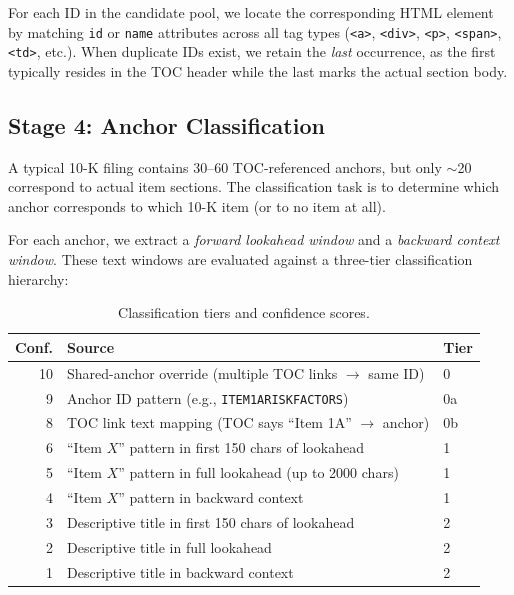 \documentclass[11pt,a4paper]{article}
\begin{document}
For each ID in the candidate pool, we locate the corresponding HTML element by matching \texttt{id} or \texttt{name} attributes across all tag types (\texttt{<a>}, \texttt{<div>}, \texttt{<p>}, \texttt{<span>}, \texttt{<td>}, etc.). When duplicate IDs exist, we retain the \emph{last} occurrence, as the first typically resides in the TOC header while the last marks the actual section body.

\subsection{Stage 4: Anchor Classification}

A typical 10-K filing contains 30--60 TOC-referenced anchors, but only $\sim$20 correspond to actual item sections. The classification task is to determine which anchor corresponds to which 10-K item (or to no item at all).

For each anchor, we extract a \emph{forward lookahead window} and a \emph{backward context window}. These text windows are evaluated against a three-tier classification hierarchy:

\begin{table}[H]
\centering
\caption{Classification tiers and confidence scores.}
\begin{tabular}{rll}
\toprule
\textbf{Conf.} & \textbf{Source} & \textbf{Tier}\\
\midrule
10 & Shared-anchor override (multiple TOC links $\to$ same ID) & 0\\
9 & Anchor ID pattern (e.g., \texttt{ITEM1ARISKFACTORS}) & 0a\\
8 & TOC link text mapping (TOC says ``Item 1A'' $\to$ anchor) & 0b\\
6 & ``Item $X$'' pattern in first 150 chars of lookahead & 1\\
5 & ``Item $X$'' pattern in full lookahead (up to 2000 chars) & 1\\
4 & ``Item $X$'' pattern in backward context & 1\\
3 & Descriptive title in first 150 chars of lookahead & 2\\
2 & Descriptive title in full lookahead & 2\\
1 & Descriptive title in backward context & 2\\
\bottomrule
\end{tabular}
\end{table}
\end{document}
